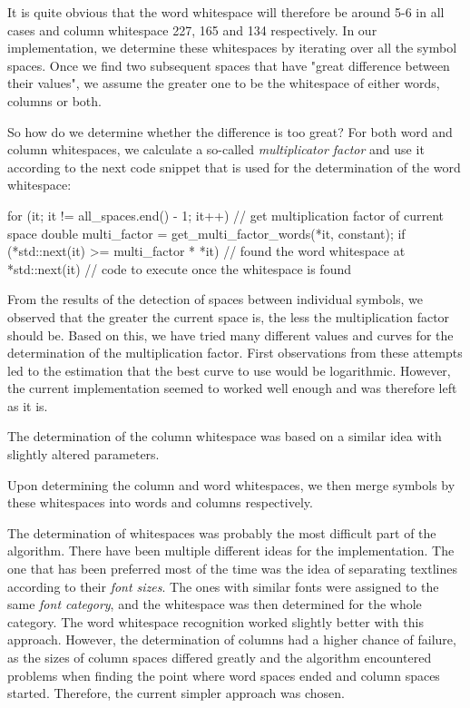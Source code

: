 \begin{enumerate}
It is quite obvious that the word whitespace will therefore be around 5-6 in all cases and column whitespace 227, 165 and 134 respectively. In our implementation, we determine these whitespaces by iterating over all the symbol spaces. Once we find two subsequent spaces that have "great difference between their values", we assume the greater one to be the whitespace of either words, columns or both.

So how do we determine whether the difference is too great? For both word and column whitespaces, we calculate a so-called \emph{multiplicator factor} and use it according to the next code snippet that is used for the determination of the word whitespace:

\begin{code}
for (it; it != all_spaces.end() - 1; it++)
{
  // get multiplication factor of current space
  double multi_factor = get_multi_factor_words(*it, constant);
  if (*std::next(it) >= multi_factor * *it)
  {
    // found the word whitespace at *std::next(it)
    // code to execute once the whitespace is found
  }
}
\end{code}

From the results of the detection of spaces between individual symbols, we observed that the greater the current space is, the less the multiplication factor should be. Based on this, we have tried many different values and curves for the determination of the multiplication factor. First observations from these attempts led to the estimation that the best curve to use would be logarithmic. However, the current implementation seemed to worked well enough and was therefore left as it is.

The determination of the column whitespace was based on a similar idea with slightly altered parameters.

Upon determining the column and word whitespaces, we then merge symbols by these whitespaces into words and columns respectively.

The determination of whitespaces was probably the most difficult part of the algorithm. There have been multiple different ideas for the implementation. The one that has been preferred most of the time was the idea of separating textlines according to their \emph{font sizes}. The ones with similar fonts were assigned to the same \emph{font category}, and the whitespace was then determined for the whole category. The word whitespace recognition worked slightly better with this approach. However, the determination of columns had a higher chance of failure, as the sizes of column spaces differed greatly and the algorithm encountered problems when finding the point where word spaces ended and column spaces started. Therefore, the current simpler approach was chosen.


\end{enumerate}
